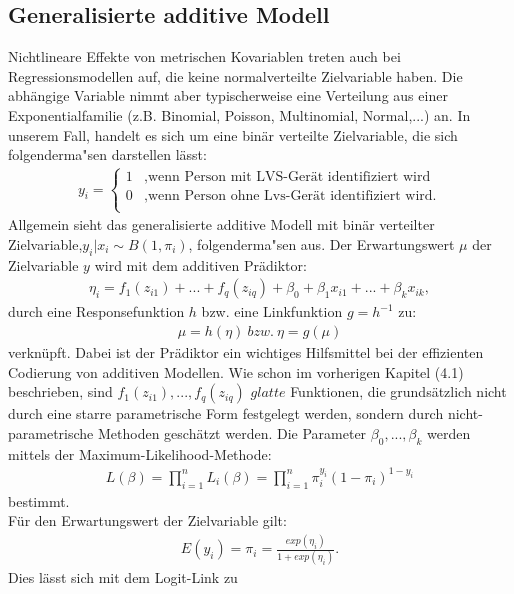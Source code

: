 \documentclass[12pt]{scrreprt}
\begin{document}
	\subsection{Generalisierte additive Modell}
	Nichtlineare Effekte von metrischen Kovariablen treten auch bei Regressionsmodellen auf, die keine normalverteilte Zielvariable haben. Die abhängige Variable nimmt aber typischerweise eine Verteilung aus einer Exponentialfamilie (z.B. Binomial, Poisson, Multinomial, Normal,...) an.  In unserem Fall, handelt es sich um eine binär verteilte Zielvariable, die sich folgenderma"sen darstellen lässt:
	\begin{align}
	y_{i}=\begin{cases}
	1 & \text{,wenn Person mit LVS-Gerät identifiziert wird } \\
	0 & \text{,wenn Person ohne Lvs-Gerät identifiziert wird.} \\
	\end{cases}
	\end{align}
	Allgemein sieht das generalisierte additive Modell mit binär verteilter Zielvariable,\enspace $y_{i}|x_{i}\sim B(1,\pi_{i})$, folgenderma"sen aus.
	Der Erwartungswert $\mu$ der Zielvariable $y$ wird mit dem additiven Prädiktor:
	\begin{align}
	\eta_{i}= f_{1}(z_{i1})+...+f_{q}(z_{iq})+\beta_{0}+\beta_{1}x_{i1}+...+\beta_{k}x_{ik},
	\end{align}
	durch eine Responsefunktion $h$ bzw. eine Linkfunktion $g=h^{-1}$ zu:
	\begin{align}
	\mu=h(\eta) ~bzw. ~\eta=g(\mu)
	\end{align}
	verknüpft.
	Dabei ist der Prädiktor ein wichtiges Hilfsmittel bei der effizienten Codierung von additiven Modellen. Wie schon im vorherigen Kapitel (4.1) beschrieben, sind $f_{1}(z_{i1}),...,f_{q}(z_{iq})$ $glatte$ Funktionen, die grundsätzlich nicht durch eine starre parametrische Form festgelegt werden, sondern durch nicht-parametrische Methoden geschätzt werden. Die Parameter $\beta_{0},...,\beta_{k}$ werden mittels der Maximum-Likelihood-Methode:
	\begin{align}
	L(\beta)=\prod_{i=1}^{n}L_{i}(\beta)=\prod_{i=1}^{n}\pi_{i}^{y_{i}}(1-\pi_{i})^{1-y_{i}}
	\end{align}
	bestimmt. \\
	Für den Erwartungswert der Zielvariable gilt:
	\begin{align}
	E(y_{i})=\pi_{i}=\frac{exp(\eta_{i})}{1+exp(\eta_{i})}.
	\end{align}
	Dies lässt sich mit dem Logit-Link zu
\end{document}
